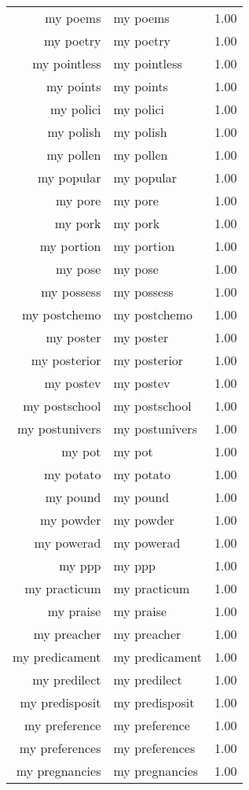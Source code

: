\begin{table}[ht]
\begin{tabular}{rlr}
  my poems & my poems & 1.00 \\ 
  my poetry & my poetry & 1.00 \\ 
  my pointless & my pointless & 1.00 \\ 
  my points & my points & 1.00 \\ 
  my polici & my polici & 1.00 \\ 
  my polish & my polish & 1.00 \\ 
  my pollen & my pollen & 1.00 \\ 
  my popular & my popular & 1.00 \\ 
  my pore & my pore & 1.00 \\ 
  my pork & my pork & 1.00 \\ 
  my portion & my portion & 1.00 \\ 
  my pose & my pose & 1.00 \\ 
  my possess & my possess & 1.00 \\ 
  my postchemo & my postchemo & 1.00 \\ 
  my poster & my poster & 1.00 \\ 
  my posterior & my posterior & 1.00 \\ 
  my postev & my postev & 1.00 \\ 
  my postschool & my postschool & 1.00 \\ 
  my postunivers & my postunivers & 1.00 \\ 
  my pot & my pot & 1.00 \\ 
  my potato & my potato & 1.00 \\ 
  my pound & my pound & 1.00 \\ 
  my powder & my powder & 1.00 \\ 
  my powerad & my powerad & 1.00 \\ 
  my ppp & my ppp & 1.00 \\ 
  my practicum & my practicum & 1.00 \\ 
  my praise & my praise & 1.00 \\ 
  my preacher & my preacher & 1.00 \\ 
  my predicament & my predicament & 1.00 \\ 
  my predilect & my predilect & 1.00 \\ 
  my predisposit & my predisposit & 1.00 \\ 
  my preference & my preference & 1.00 \\ 
  my preferences & my preferences & 1.00 \\ 
  my pregnancies & my pregnancies & 1.00 \\ 

\end{tabular}
\end{table}
